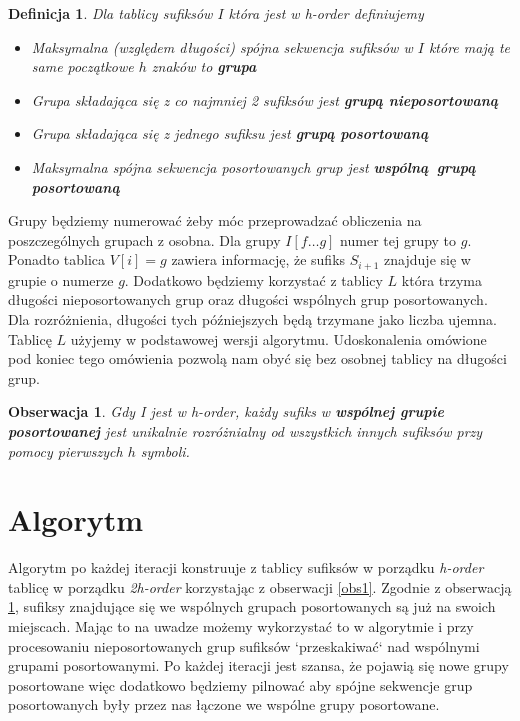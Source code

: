 \documentclass[12pt]{article}
\newtheorem{observation}{Obserwacja}
\newtheorem*{definition}{Definicja}
\begin{document}
\begin{definition}
Dla tablicy sufiksów $I$ która jest w \textit{h-order} definiujemy
\begin{itemize}
    \item Maksymalna (względem długości) spójna sekwencja sufiksów w $I$ które mają te same początkowe $h$ znaków to \textbf{grupa}
    \item Grupa składająca się z co najmniej 2 sufiksów jest \textbf{grupą nieposortowaną}
    \item Grupa składająca się z jednego sufiksu jest \textbf{grupą posortowaną}
    \item Maksymalna spójna sekwencja posortowanych grup jest \textbf{wspólną grupą posortowaną}
\end{itemize}
\end{definition}
Grupy będziemy numerować żeby móc przeprowadzać obliczenia na poszczególnych grupach z osobna. Dla grupy $I[f \ldots g]$ numer tej grupy to $g$. Ponadto tablica $V[i] = g$ zawiera informację, że sufiks $S_{i+1}$ znajduje się w grupie o numerze $g$. Dodatkowo będziemy korzystać z tablicy $L$ która trzyma długości nieposortowanych grup oraz długości wspólnych grup posortowanych. Dla rozróżnienia, długości tych późniejszych będą trzymane jako liczba ujemna. Tablicę $L$ użyjemy w podstawowej wersji algorytmu. Udoskonalenia omówione pod koniec tego omówienia pozwolą nam obyć się bez osobnej tablicy na długości grup.
\begin{observation}
\label{obs2}
Gdy I jest w \textit{h-order}, każdy sufiks w \textbf{wspólnej grupie posortowanej} jest unikalnie rozróżnialny od wszystkich innych sufiksów przy pomocy pierwszych $h$ symboli.
\end{observation}

\section*{Algorytm}

Algorytm po każdej iteracji konstruuje z tablicy sufiksów w porządku \textit{h-order} tablicę w porządku \textit{2h-order} korzystając z obserwacji \ref{obs1}. Zgodnie z obserwacją \ref{obs2}, sufiksy znajdujące się we wspólnych grupach posortowanych są już na swoich miejscach. Mając to na uwadze możemy wykorzystać to w algorytmie i przy procesowaniu nieposortowanych grup sufiksów `przeskakiwać` nad wspólnymi grupami posortowanymi. Po każdej iteracji jest szansa, że pojawią się nowe grupy posortowane więc dodatkowo będziemy pilnować aby spójne sekwencje grup posortowanych były przez nas łączone we wspólne grupy posortowane.
\end{document}
